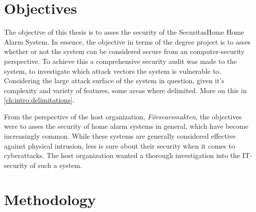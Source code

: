 \section{Objectives} \label{ch:intro:objectives}

The objective of this thesis is to asses the security of the SecuritasHome Home Alarm System. In essence, the objective in terms of the degree project is to asses whether or not the system can be considered secure from an computer-security perspective. To achieve this a comprehensive security audit was made to the system, to investigate which attack vectors the system is vulnerable to. Considering the large attack surface of the system in question, given it's complexity and variety of features, some areas where delimited. More on this in \ref{ch:intro:delimitations}.

From the perspective of the host organization, \textit{Försvarsmakten}, the objectives were to asses the security of home alarm systems in general, which have become increasingly common. While these systems are generally considered effective against physical intrusion, less is sure about their security when it comes to cyberattacks. The host organization wanted a thorough investigation into the IT-security of such a system.

\section{Methodology} \label{ch:intro:methodology}

